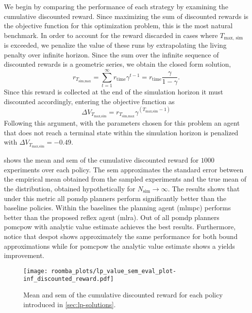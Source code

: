 We begin by comparing the performance of each strategy by examining the
cumulative discounted reward. Since maximizing the sum of discounted rewards is
the objective function for this optimization problem, this is the most natural
benchmark. In order to account for the reward discarded in cases where
$T_\text{max, sim}$ is exceeded, we penalize the value of these runs by
extrapolating the living penalty over infinite horizon. Since the sum over the
infinite sequence of discounted rewards is a geometric series, we obtain the
closed form solution,
\begin{equation}
  r_{T_\text{sim,max}} = \sum_{t=1}^\infty r_\text{time} \gamma^{t-1} =  r_\text{time} \frac{\gamma}{1-\gamma}.
\end{equation}
Since this reward is collected at the end of the simulation horizon it must
discounted accordingly, entering the objective function as
\begin{equation}
  \Delta V_{T_\text{max,sim}} = r_{T_\text{sim,max}} \gamma^{(T_\text{max,sim} - 1)}
\end{equation}
Following this argument, with the parameters chosen for this problem an agent
that does not reach a terminal state within the simulation horizon is penalized
with $\Delta V_{T_\text{max,sim}} = -0.49$.

 shows the mean and \ac{sem} of the cumulative
discounted reward for $1000$ experiments over each policy. The \ac{sem}
approximates the standard error between the empirical mean obtained from the
sampled experiments and the true mean of the distribution, obtained
hypothetically for $N_\text{sim} \to \infty$. The results shows that under this
metric all \ac{pomdp} planners perform significantly better than the baseline
policies. Within the baselines the planning agent (\ac{mlmpc}) performs better
than the proposed reflex agent (\ac{mlra}). Out of all \ac{pomdp} planners
\ac{pomcpow} with analytic value estimate achieves the best results. Furthermore,
notice that \ac{despot} shows approximately the same performance for both bound
approximations while for \ac{pomcpow} the analytic value estimate shows a yields
improvement.

\begin{figure}[H]
  \centering
  \texttt{[image: roomba\_plots/lp\_value\_sem\_eval\_plot-inf\_discounted\_reward.pdf]}
  \caption{Mean and \acf{sem} of the cumulative discounted reward for each policy introduced in \cref{sec:lp-solutions}.}
  \label{fig:lp-value-sem-inf-discounted}
\end{figure}

